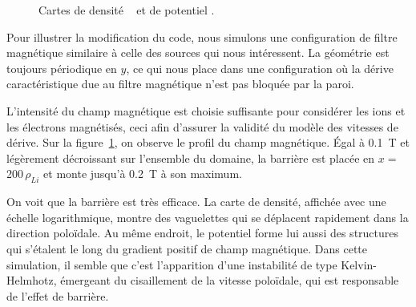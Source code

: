 \begin{refsection}
\begin{figure}[!htbp]
    \centering
    \caption{Cartes de densité ~ et de
    potentiel
    .}
    \label{2-CartesMagBarrier}
\end{figure}

Pour illustrer la modification du code, nous simulons une configuration de
filtre magnétique similaire à celle des sources qui nous intéressent. 
La géométrie est toujours périodique en $y$, ce qui nous place dans une
configuration où la dérive caractéristique due au filtre magnétique n'est pas
bloquée par la paroi.

L'intensité du champ
magnétique est choisie suffisante pour considérer les ions et les électrons
magnétisés, ceci afin d'assurer la validité du modèle des vitesses de dérive.
Sur la figure~\ref{2-CartesMagBarrier}, on observe le profil du champ
magnétique. Égal à 0.1~T et légèrement décroissant sur l'ensemble du domaine,
la barrière est placée en $x=\,$200$\,\rho_{Li}$ et monte jusqu'à 0.2~T à son maximum.

On voit que la barrière est très efficace. La carte de densité, affichée avec
une échelle logarithmique, montre des vaguelettes qui se déplacent rapidement
dans la direction poloïdale.
Au même endroit, le potentiel forme lui aussi des structures qui s'étalent le
long du gradient positif de champ magnétique. 
Dans cette simulation, il semble que c'est l'apparition d'une instabilité de
type Kelvin-Helmhotz, émergeant du cisaillement de la vitesse 
poloïdale, qui est responsable de l'effet de barrière.


\end{refsection}
